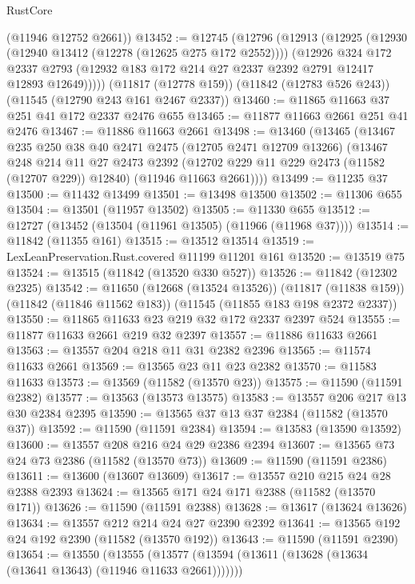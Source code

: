 \begin{lexlean}{RustCore}
\begin{coremodule}
      (@11946 @12752 @2661))
@13452 := @12745
    (@12796
      (@12913
        (@12925
          (@12930 (@12940 @13412 (@12278 (@12625 @275 @172 @2552))))
          (@12926
            @324
            @172
            @2337
            @2793
            (@12932 @183 @172 @214 @27 @2337 @2392 @2791 @12417 @12893 @12649)))))
    (@11817 (@12778 @159))
    (@11842 (@12783 @526 @243))
    (@11545 (@12790 @243 @161 @2467 @2337))
@13460 := @11865 @11663 @37 @251 @41 @172 @2337 @2476 @655
@13465 := @11877 @11663 @2661 @251 @41 @2476
@13467 := @11886 @11663 @2661
@13498 := @13460
    (@13465
      (@13467
        @235
        @250
        @38
        @40
        @2471
        @2475
        (@12705 @2471 @12709 @13266)
        (@13467
          @248
          @214
          @11
          @27
          @2473
          @2392
          (@12702 @229 @11 @229 @2473 (@11582 (@12707 @229)) @12840)
          (@11946 @11663 @2661))))
@13499 := @11235 @37
@13500 := @11432 @13499
@13501 := @13498 @13500
@13502 := @11306 @655
@13504 := @13501 (@11957 @13502)
@13505 := @11330 @655
@13512 := @12727 (@13452 (@13504 (@11961 @13505) (@11966 (@11968 @37))))
@13514 := @11842 (@11355 @161)
@13515 := @13512 @13514
@13519 := LexLeanPreservation.Rust.covered @11199 @11201 @161
@13520 := @13519 @75
@13524 := @13515 (@11842 (@13520 @330 @527))
@13526 := @11842 (@12302 @2325)
@13542 := @11650
    (@12668 (@13524 @13526))
    (@11817 (@11838 @159))
    (@11842 (@11846 @11562 @183))
    (@11545 (@11855 @183 @198 @2372 @2337))
@13550 := @11865 @11633 @23 @219 @32 @172 @2337 @2397 @524
@13555 := @11877 @11633 @2661 @219 @32 @2397
@13557 := @11886 @11633 @2661
@13563 := @13557 @204 @218 @11 @31 @2382 @2396
@13565 := @11574 @11633 @2661
@13569 := @13565 @23 @11 @23 @2382
@13570 := @11583 @11633
@13573 := @13569 (@11582 (@13570 @23))
@13575 := @11590 (@11591 @2382)
@13577 := @13563 (@13573 @13575)
@13583 := @13557 @206 @217 @13 @30 @2384 @2395
@13590 := @13565 @37 @13 @37 @2384 (@11582 (@13570 @37))
@13592 := @11590 (@11591 @2384)
@13594 := @13583 (@13590 @13592)
@13600 := @13557 @208 @216 @24 @29 @2386 @2394
@13607 := @13565 @73 @24 @73 @2386 (@11582 (@13570 @73))
@13609 := @11590 (@11591 @2386)
@13611 := @13600 (@13607 @13609)
@13617 := @13557 @210 @215 @24 @28 @2388 @2393
@13624 := @13565 @171 @24 @171 @2388 (@11582 (@13570 @171))
@13626 := @11590 (@11591 @2388)
@13628 := @13617 (@13624 @13626)
@13634 := @13557 @212 @214 @24 @27 @2390 @2392
@13641 := @13565 @192 @24 @192 @2390 (@11582 (@13570 @192))
@13643 := @11590 (@11591 @2390)
@13654 := @13550
    (@13555 (@13577 (@13594 (@13611 (@13628 (@13634 (@13641 @13643) (@11946 @11633 @2661)))))))

\end{coremodule}
\end{lexlean}
